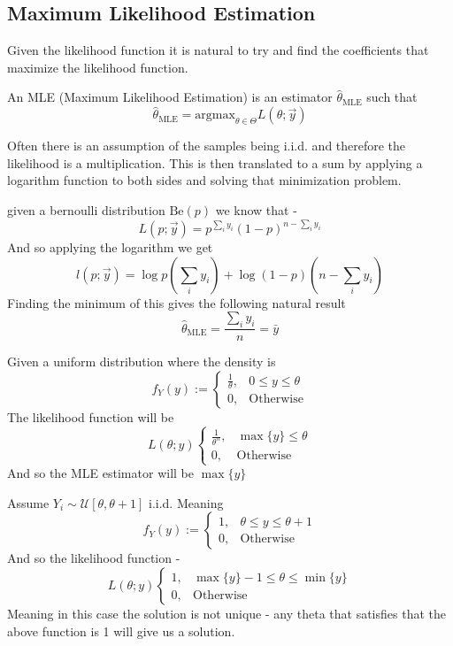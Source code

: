 \documentclass[../main.tex]{subfiles}
\begin{document}
\subsection{Maximum Likelihood Estimation}
Given the likelihood function it is natural to try and find the coefficients that maximize the likelihood function.
\begin{example}
An MLE (Maximum Likelihood Estimation) is an estimator $\hat{\theta}_{\text{MLE}}$ such that
\[\hat{\theta}_{\text{MLE}} = \text{argmax}_{\theta\in\Theta} L(\theta;\overrightarrow{y})\] \end{example}
Often there is an assumption of the samples being i.i.d. and therefore the likelihood is a multiplication. This is then translated to a sum by applying a logarithm function to both sides and solving that minimization problem. 
\begin{example} 
given a bernoulli distribution $\text{Be}(p)$ we know that - 
\[L(p;\overrightarrow{y}) = p^{\sum_i y_i}(1-p)^{n-\sum_i y_i}\]
And so applying the logarithm we get 
\[l(p;\overrightarrow{y}) = \log p\left(\sum_i y_i\right) + \log(1-p)\left(n-\sum_i y_i\right)\]
Finding the minimum of this gives the following natural result \[\hat{\theta}_{\text{MLE}} = \frac{\sum_i y_i}{n}=\bar{y}\]
\end{example}
\begin{example}
Given a uniform distribution where the density is
\[f_Y(y):=\begin{cases} \frac{1}{\theta}, & 0\leq y \leq\theta \\ 0, & \text{Otherwise}\end{cases}\]
The likelihood function will be \[L(\theta;y)\begin{cases} \frac{1}{\theta^n}, & \max{\{y\}} \leq\theta \\ 0, & \text{Otherwise}\end{cases}\]
And so the MLE estimator will be $\max\{y\}$
\end{example}
\newpage
\begin{example} Assume $Y_i\sim\mathcal{U}[\theta,\theta+1]$ i.i.d.
Meaning \[f_Y(y):=\begin{cases} 1, & \theta\leq y \leq\theta+1 \\ 0, & \text{Otherwise}\end{cases}\]
And so the likelihood function - 
\[L(\theta;y)\begin{cases} 1, & \max{\{y\}}-1\leq\theta\leq\min{\{y\}} \\ 0, & \text{Otherwise}\end{cases}\]
Meaning in this case the solution is not unique - any theta that satisfies that the above function is 1 will give us a solution. \end{example}
\end{document}
